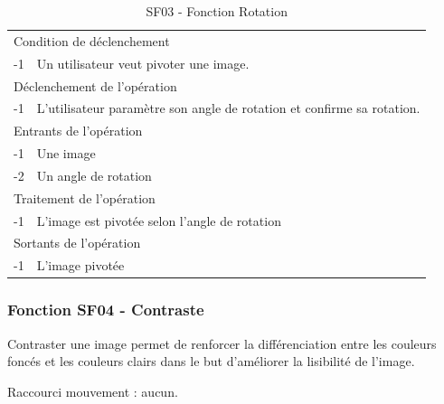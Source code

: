 \documentclass[a4paper]{article}
\begin{document}
\begin{table}[H]
  \centering
   \small
	\begin{tabular}{|c|p{12cm}|}
   		\hline
   			\rowcolor{lightgray}\multicolumn{2}{|c|}{\textbf{SF03 - Fonction Rotation}} \\
   		\hline
   			\multicolumn{2}{|l|}{Condition de d\'eclenchement} \\
   		\hline
   			-1 & Un utilisateur veut pivoter une image. \\
   		\hline
   			\multicolumn{2}{|l|}{D\'eclenchement de l'op\'eration} \\
   		\hline
   			-1 & L'utilisateur paramètre son angle de rotation et confirme sa rotation. \\
   		\hline
   			\multicolumn{2}{|l|}{Entrants de l'op\'eration} \\
   		\hline
        	-1 & Une image \\
   			-2 & Un angle de rotation \\ 	
        \hline
   			\multicolumn{2}{|l|}{Traitement de l'op\'eration} \\
  		\hline
   			-1 & L'image est pivotée selon l'angle de rotation \\
   		\hline
   			\multicolumn{2}{|l|}{Sortants de l'op\'eration} \\
   		\hline
   			-1 & L'image pivotée \\
   		\hline
	\end{tabular}
  \caption{SF03 - Fonction Rotation}
  \normalsize
  \label{tab:visu_img_rotation}
\end{table}


\subsubsection{Fonction SF04 - Contraste}

Contraster une image permet de renforcer la différenciation entre les couleurs foncés et les couleurs clairs dans le but d'améliorer la lisibilité de l'image.

Raccourci mouvement : aucun.
\end{document}
